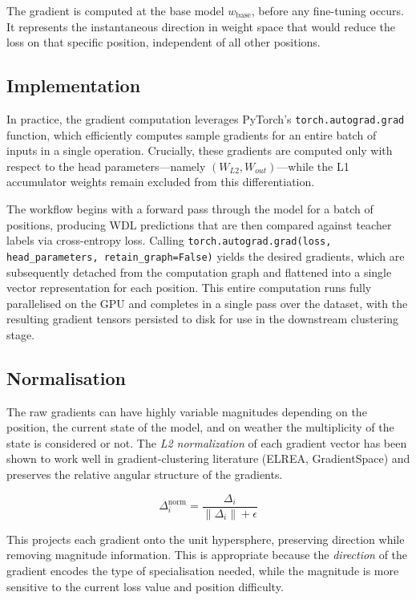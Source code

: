 The gradient is computed at the base model $w_{\text{base}}$, before any fine-tuning occurs. It represents the instantaneous direction in weight space that would reduce the loss on that specific position, independent of all other positions.

\subsection{Implementation}

In practice, the gradient computation leverages PyTorch's \texttt{torch.autograd.grad} function, which efficiently computes sample gradients for an entire batch of inputs in a single operation. Crucially, these gradients are computed only with respect to the head parameters---namely $(W_{L2}, W_{out})$---while the L1 accumulator weights remain excluded from this differentiation.

The workflow begins with a forward pass through the model for a batch of positions, producing WDL predictions that are then compared against teacher labels via cross-entropy loss. Calling \texttt{torch.autograd.grad(loss, head\_parameters, retain\_graph=False)} yields the desired gradients, which are subsequently detached from the computation graph and flattened into a single vector representation for each position. This entire computation runs fully parallelised on the GPU and completes in a single pass over the dataset, with the resulting gradient tensors persisted to disk for use in the downstream clustering stage.

\subsection{Normalisation}

The raw gradients can have highly variable magnitudes depending on the position, the current state of the model, and on weather the multiplicity of the state is considered or not. The \emph{L2 normalization} of each gradient vector has been shown to work well in gradient-clustering literature (ELREA, GradientSpace) and preserves the relative angular structure of the gradients.

\[\Delta_i^{\text{norm}} = \frac{\Delta_i}{\|\Delta_i\| + \epsilon}\]

This projects each gradient onto the unit hypersphere, preserving direction while removing magnitude information. This is appropriate because the \emph{direction} of the gradient encodes the type of specialisation needed, while the magnitude is more sensitive to the current loss value and position difficulty.


